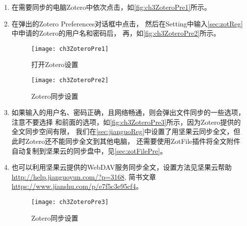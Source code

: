\documentclass[cn,11pt,chinese]{elegantbook}
\begin{document}
		\begin{enumerate}
			\item 
			在需要同步的电脑Zotero中依次点击，如\autoref{fig:ch3ZoteroPre1}所示。
			\item
			在弹出的Zotero Preferences对话框中点击，
			然后在Setting中输入\cref{sec:zotReg}中申请的Zotero的用户名和密码后，
			再，如\autoref{fig:ch3ZoteroPre2}所示。
				\begin{figure}[t]
					\centering
					\begin{minipage}[t]{\dimexpr0.5\textwidth-4em}
						\centering
						\texttt{[image: ch3ZoteroPre1]}
						\caption{打开Zotero设置}
						\label{fig:ch3ZoteroPre1}
				\end{minipage}
				\begin{minipage}[t]{\dimexpr0.5\textwidth-4em}
					\centering
					\texttt{[image: ch3ZoteroPre2]}
					\caption{Zotero同步设置}
					\label{fig:ch3ZoteroPre2}
				\end{minipage}
			\end{figure}
			\item
			如果输入的用户名、密码正确，且网络畅通，则会弹出文件同步的一些选项，
			注意不要选择
			和前面的选项，如\autoref{fig:ch3ZoteroPre3}所示，因为Zotero提供的全文同步空间有限，
			我们在\cref{sec:jianguoReg}中设置了用坚果云同步全文，但此时Zotero还不能同步全文到其他电脑，
			还需要使用ZotFile插件将全文附件自动复制到坚果云的同步盘中，见\cref{sec:zotFilePre}。
			\item				  	
			也可以利用坚果云提供的WebDAV服务同步全文，设置方法见坚果云帮助\url{http://help.jianguoyun.com/?p=3168},
			简书文章\url{https://www.jianshu.com/p/e7f5c3e95cf4}。			  
			\begin{figure}[htbp]
				\centering
				\texttt{[image: ch3ZoteroPre3]}
				\caption{Zotero同步设置}
				\label{fig:ch3ZoteroPre3}
			\end{figure}
		\end{enumerate}
		
		
		
\end{document}

